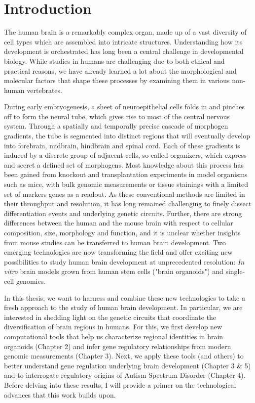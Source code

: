 \thispagestyle{plain}
\section{Introduction}




The human brain is a remarkably complex organ, made up of a vast diversity of cell types which are assembled into intricate structures. Understanding how its development is orchestrated has long been a central challenge in developmental biology. While studies in humans are challenging due to both ethical and practical reasons, we have already learned a lot about the morphological and molecular factors that shape these processes by examining them in various non-human vertebrates.

During early embryogenesis, a sheet of neuroepithelial cells folds in and pinches off to form the neural tube, which gives rise to most of the central nervous system. Through a spatially and temporally precise cascade of morphogen gradients, the tube is segmented into distinct regions that will eventually develop into forebrain, midbrain, hindbrain and spinal cord. Each of these gradients is induced by a discrete group of adjacent cells, so-called organizers, which express and secret a defined set of morphogens. Most knowledge about this process has been gained from knockout and transplantation experiments in model organisms such as mice, with bulk genomic measurements or tissue stainings with a limited set of markers genes as a readout. As these conventional methods are limited in their throughput and resolution, it has long remained challenging to finely dissect differentiation events and underlying genetic circuits. Further, there are strong differences between the human and the mouse brain with respect to cellular composition, size, morphology and function, and it is unclear whether insights from mouse studies can be transferred to human brain development. Two emerging technologies are now transforming the field and offer exciting new possibilities to study human brain development at unprecedented resolution: ​\textit{In vitro} brain models grown from human stem cells ("brain organoids") and single-cell genomics.

In this thesis, we want to harness and combine these new technologies to take a fresh approach to the study of human brain development. In particular, we are interested in shedding light on the genetic circuits that coordinate the diversification of brain regions in humans. For this, we first develop new computational tools that help us characterize regional identities in brain organoids (Chapter 2) and infer gene regulatory relationships from modern genomic measurements (Chapter 3). Next, we apply these tools (and others) to better understand gene regulation underlying brain development (Chapter 3 \& 5) and to interrogate regulatory origins of Autism Spectrum Disorder (Chapter 4). Before delving into these results, I will provide a primer on the technological advances that this work builds upon.

